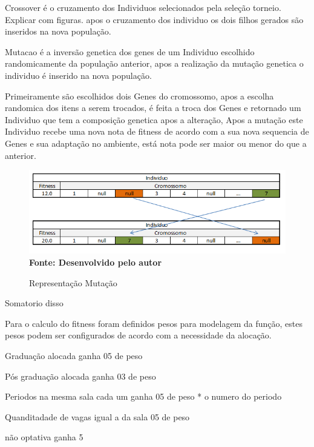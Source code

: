 \documentclass{abntpuc}
\begin{document}
Crossover é o cruzamento dos Individuos selecionados pela seleção torneio. Explicar com figuras. apos o cruzamento dos individuo os dois filhos gerados são inseridos na nova população.\par

Mutacao é a inversão genetica dos genes de um Individuo escolhido randomicamente da população anterior, apos a realização da mutação genetica o individuo é inserido na nova população.\par

Primeiramente são escolhidos dois Genes do cromossomo, apos a escolha randomica dos itens a serem trocados, é feita a troca dos Genes e retornado um Individuo que tem a composição genetica apos a alteração, Apos a mutação este Individuo recebe uma nova nota de fitness de acordo com a sua nova sequencia de Genes e sua adaptação no ambiente, está nota pode ser maior ou menor do que a anterior.\par

\begin{figure}[!htb]
\caption[Representação Mutação]{Representação Mutação}
\label{fig:figura8}
\centering
\includegraphics[scale=0.7]{imagens/representacaoMutacao.png}
\\ \textbf{\footnotesize Fonte: Desenvolvido pelo autor}
\end{figure}



Somatorio disso

Para o calculo do fitness foram definidos pesos para modelagem da função, estes pesos podem ser configurados de acordo com a necessidade da alocação.

Graduação alocada ganha 05 de peso

Pós graduação alocada ganha 03 de peso

Periodos na mesma sala cada um ganha 05 de peso * o numero do periodo

Quanditadade de vagas igual a da sala 05 de peso

não optativa ganha 5
\end{document}
